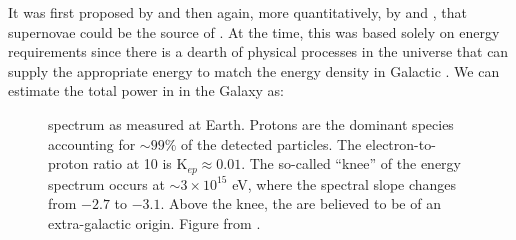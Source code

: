 It was first proposed by \cite{Baade34} and then again, more quantitatively, by \cite{Ginzburg64} and \cite{Hayakawa69}, that supernovae could be the source of \crs{}. At the time, this was based solely on energy requirements since  there is a dearth of physical processes in the universe that can supply the appropriate energy to match the energy density in Galactic \crs{}. We can estimate the total power in \crs{} in the Galaxy as:

\begin{figure}[h!]%
	\centering
	\caption[CR spectrum as measured at Earth]{\cray{} spectrum as measured at Earth. Protons are the dominant species accounting for  $\sim 99\%$ of the detected particles. The electron-to-proton ratio at 10\gev{} is  K$_{ep} \approx 0.01$. The so-called ``knee'' of the \cray{} energy spectrum occurs at $\sim 3\times 10^{15}$ eV, where the \pl{} spectral slope changes from $-2.7$ to $-3.1$. Above the knee, the \crs{} are believed to be of an extra-galactic origin. Figure from \cite{Blasi13}.
	\label{fig:CRspec}} 
\end{figure}

